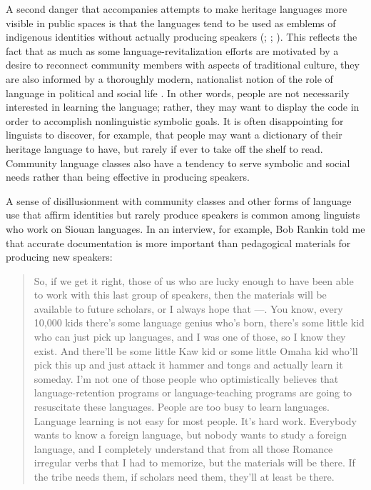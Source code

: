 \documentclass[output=paper]{LSP/langsci}
\begin{document}
A second danger that accompanies attempts to make heritage languages more visible in public spaces is that the languages tend to be used as emblems of indigenous identities without actually producing speakers (\citealt{Ahlers2006}; \citealt[98]{DauenhauerDauenhauer1998}; \citealt[715]{Whiteley2003}). This reflects the fact that as much as some language-revitalization efforts are motivated by a desire to reconnect community members with aspects of traditional culture, they are also informed by a thoroughly modern, nationalist notion of the role of language in political and social life \citep{KroskrityField2009, Nevins2013}. In other words, people are not necessarily interested in learning the language; rather, they may want to display the code in order to accomplish nonlinguistic symbolic goals. It is often disappointing for linguists to discover, for example, that people may want a dictionary of their heritage language to have, but rarely if ever to take off the shelf to read. Community language classes also have a tendency to serve symbolic and social needs rather than being effective in producing speakers. 

A sense of disillusionment with community classes and other forms of language use that affirm identities but rarely produce speakers is common among linguists who work on Siouan languages. In an interview, for example, Bob Rankin told me that accurate documentation is more important than pedagogical materials for producing new speakers:

\begin{quote} So, if we get it right, those of us who are lucky enough to have been able to work with this last group of speakers, then the materials will be available to future scholars, or I always hope that ---. You know, every 10,000 kids there's some language genius who's born, there's some little kid who can just pick up languages, and I was one of those, so I know they exist. And there'll be some little Kaw kid or some little Omaha kid who'll pick this up and just attack it hammer and tongs and actually learn it someday. I'm not one of those people who optimistically believes that language-retention programs or language-teaching programs are going to resuscitate these languages. People are too busy to learn languages. Language learning is not easy for most people. It's hard work. Everybody wants to know a foreign language, but nobody wants to study a foreign language, and I completely understand that from all those Romance irregular verbs that I had to memorize, but the materials will be there. If the tribe needs them, if scholars need them, they'll at least be there.\end{quote}
\end{document}
